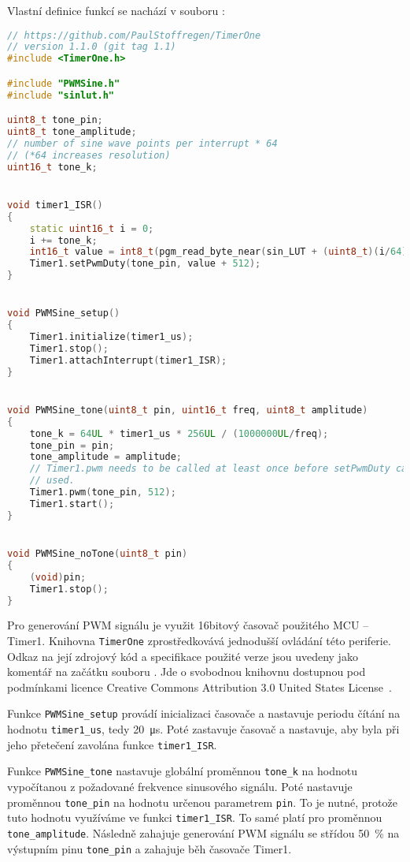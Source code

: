 Vlastní definice funkcí se nachází v souboru :
\begin{lstlisting}[language=C++,style=numbers]
// https://github.com/PaulStoffregen/TimerOne
// version 1.1.0 (git tag 1.1)
#include <TimerOne.h>

#include "PWMSine.h"
#include "sinlut.h"

uint8_t tone_pin;
uint8_t tone_amplitude;
// number of sine wave points per interrupt * 64
// (*64 increases resolution)
uint16_t tone_k;


void timer1_ISR()
{
    static uint16_t i = 0;
    i += tone_k;
    int16_t value = int8_t(pgm_read_byte_near(sin_LUT + (uint8_t)(i/64))) * tone_amplitude / 64;
    Timer1.setPwmDuty(tone_pin, value + 512);
}


void PWMSine_setup()
{
    Timer1.initialize(timer1_us);
    Timer1.stop();
    Timer1.attachInterrupt(timer1_ISR);
}


void PWMSine_tone(uint8_t pin, uint16_t freq, uint8_t amplitude)
{
    tone_k = 64UL * timer1_us * 256UL / (1000000UL/freq);
    tone_pin = pin;
    tone_amplitude = amplitude;
    // Timer1.pwm needs to be called at least once before setPwmDuty can be
    // used.
    Timer1.pwm(tone_pin, 512);
    Timer1.start();
}


void PWMSine_noTone(uint8_t pin)
{
    (void)pin;
    Timer1.stop();
}
\end{lstlisting}

Pro generování PWM signálu je využit 16bitový časovač použitého MCU -- Timer1.
Knihovna \texttt{TimerOne} zprostředkovává jednodušší ovládání této periferie.
Odkaz na její zdrojový kód a specifikace použité verze jsou uvedeny jako
komentář na začátku souboru . Jde o svobodnou knihovnu
dostupnou pod podmínkami licence
\foreignlanguage{english}{Creative Commons Attribution 3.0 United States
License}~\cite{TimerOnerepo}.

Funkce \verb|PWMSine_setup| provádí inicializaci časovače a nastavuje periodu
čítání na hodnotu \verb|timer1_us|, tedy \SI{20}{\micro\second}. Poté
zastavuje časovač a nastavuje, aby byla při jeho přetečení zavolána funkce
\verb|timer1_ISR|.

Funkce \verb|PWMSine_tone| nastavuje globální proměnnou \verb|tone_k| na
hodnotu vypočítanou z požadované frekvence sinusového signálu.
Poté nastavuje proměnnou \verb|tone_pin| na hodnotu určenou parametrem
\texttt{pin}. To je nutné, protože tuto hodnotu využíváme ve funkci
\verb|timer1_ISR|. To samé platí pro proměnnou \verb|tone_amplitude|.
Následně zahajuje generování PWM signálu se střídou \SI{50}{\percent} na
výstupním pinu \verb|tone_pin| a zahajuje běh časovače Timer1.

